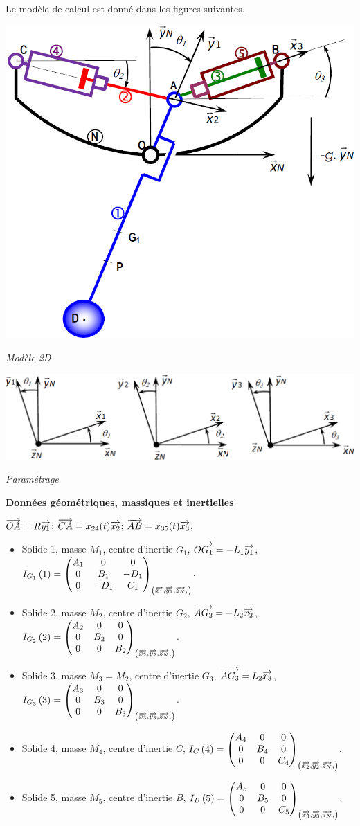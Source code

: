 \documentclass[10pt,fleqn]{article} %
\begin{document}
\begin{multicols}{2}
Le modèle de calcul est donné dans les figures suivantes.

\begin{center}
\includegraphics[width=.7\linewidth]{images/fig_05_a}

\textit{Modèle 2D}
\end{center}

\begin{center}
\includegraphics[width=\linewidth]{images/fig_05_b}

\textit{Paramétrage}
\end{center}

\textbf{Données géométriques, massiques et inertielles}
\begin{multicols}{2}
\footnotesize

$\vect{OA}=R\vect{y_1}$; $\vect{CA}=x_{24}(t)\vect{x_2}$; $\vect{AB}=x_{35}(t)\vect{x_3}$, 
\begin{itemize}
\item Solide 1, masse $M_1$, centre d'inertie $G_1$, $\vect{OG_1}=-L_1\vect{y_1}$, $\inertie{G_1}{1}=\matinertie{A_1}{B_1}{C_1}{-D_1}{0}{0}{\left(\vect{x_1},\vect{y_1},\vect{z_N}, \right)}$.
\item Solide 2, masse $M_2$, centre d'inertie $G_2$, $\vect{AG_2}=-L_2\vect{x_2}$, $\inertie{G_2}{2}=\matinertie{A_2}{B_2}{B_2}{0}{0}{0}{\left(\vect{x_2},\vect{y_2},\vect{z_N}, \right)}$.
\item Solide 3, masse $M_3=M_2$, centre d'inertie $G_3$, $\vect{AG_3}=L_2\vect{x_3}$, $\inertie{G_3}{3}=\matinertie{A_3}{B_3}{B_3}{0}{0}{0}{\left(\vect{x_3},\vect{y_3},\vect{z_N}, \right)}$.
\item Solide 4, masse $M_4$, centre d'inertie $C$, $\inertie{C}{4}=\matinertie{A_4}{B_4}{C_4}{0}{0}{0}{\left(\vect{x_2},\vect{y_2},\vect{z_N}, \right)}$.
\item Solide 5, masse $M_5$, centre d'inertie $B$, $\inertie{B}{5}=\matinertie{A_5}{B_5}{C_5}{0}{0}{0}{\left(\vect{x_3},\vect{y_3},\vect{z_N}, \right)}$.
\end{itemize}
\normalsize


\end{multicols}
\end{multicols}
\end{document}
